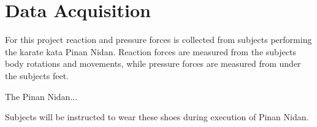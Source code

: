 \section{Data Acquisition}

For this project reaction and pressure forces is collected from subjects performing the karate kata Pinan Nidan. Reaction forces are measured from the subjects body rotations and movements, while pressure forces are measured from under the subjects feet. 

The Pinan Nidan...

Subjects will be instructed to wear these shoes during execution of Pinan Nidan. 




